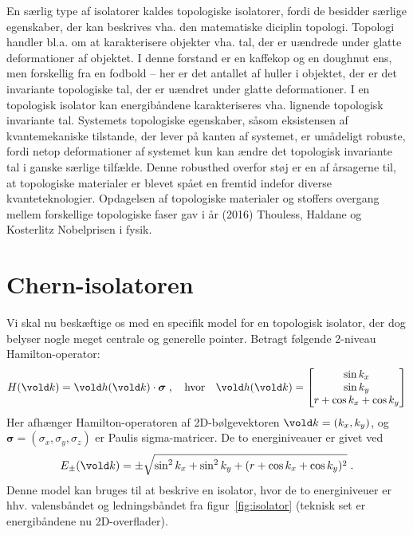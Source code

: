 \documentclass[11pt, a4paper]{article}
\let\v\vold
\newcommand{\v}[1]{{\bf{#1}}}
\begin{document}
En særlig type af isolatorer kaldes topologiske isolatorer, fordi de
besidder særlige egenskaber, der kan beskrives vha. den matematiske
diciplin topologi. Topologi handler bl.a. om at karakterisere objekter
vha. tal, der er uændrede under glatte deformationer af objektet. I
denne forstand er en kaffekop og en doughnut ens, men forskellig fra
en fodbold -- her er det antallet af huller i objektet, der er det
invariante topologiske tal, der er uændret under glatte
deformationer. I en topologisk isolator kan energibåndene
karakteriseres vha. lignende topologisk invariante tal. Systemets
topologiske egenskaber, såsom eksistensen af kvantemekaniske
tilstande, der lever på kanten af systemet, er umådeligt robuste,
fordi netop deformationer af systemet kun kan ændre det topologisk
invariante tal i ganske særlige tilfælde. Denne robusthed overfor støj
er en af årsagerne til, at topologiske materialer er blevet spået en
fremtid indefor diverse kvanteteknologier. Opdagelsen af topologiske
materialer og stoffers overgang mellem forskellige topologiske faser
gav i år (2016) Thouless, Haldane og Kosterlitz Nobelprisen i fysik.


\section{Chern-isolatoren}

Vi skal nu beskæftige os med en specifik model for en topologisk
isolator, der dog belyser nogle meget centrale og generelle
pointer. Betragt følgende 2-niveau Hamilton-operator:
\begin{equation}
  \label{eq:ci-hamilton}
  H (\v k) = \v h (\v k) \cdot \boldsymbol{\sigma}
  \; ,
  \quad
  \text{hvor}
  \quad
  \v h (\v k) =
  \begin{bmatrix}
    \sin k_x \\ \sin k_y \\ r + \cos k_x + \cos k_y
  \end{bmatrix}
\end{equation}
Her afhænger Hamilton-operatoren af 2D-bølgevektoren $\v k = (k_x,
k_y)$, og $\boldsymbol{\sigma} = (\sigma_x, \sigma_y, \sigma_z)$
er Paulis sigma-matricer. De to energiniveauer er givet ved
\begin{equation}
  \label{eq:ci-energi}
    E_\pm(\v k) = \pm
  \sqrt{\sin^2 k_x + \sin^2 k_y + (r + \cos k_x + \cos k_y)^2} \; .
\end{equation}
Denne model kan bruges til at beskrive en isolator, hvor de to
energiniveuer er hhv. valensbåndet og ledningsbåndet fra
figur~\ref{fig:isolator} (teknisk set er energibåndene nu
2D-overflader).
\end{document}
